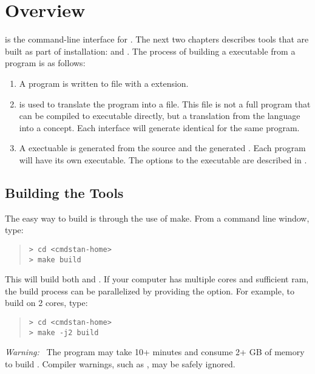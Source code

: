 \chapter{Overview}

\noindent
\CmdStan is the command-line interface for \Stan. The next two
chapters describes tools that are built as part of \CmdStan
installation:  and . The process of building a
\CmdStan executable from a \Stan program is as follows:
%
\begin{enumerate}
  \item A \Stan program is written to file with a 
    extension.
  \item {} is used to translate the \Stan program into a
    \Cpp file. This \Cpp file is not a full program that can be
    compiled to executable directly, but a translation from the \Stan
    language into a \Cpp concept. Each interface will generate identical
    \Cpp for the same \Stan program.
  \item A \CmdStan exectuable is generated from the \CmdStan source
    and the generated \Cpp. Each \Stan program will have its own
    \CmdStan executable. The options to the \CmdStan executable are
    described in .
\end{enumerate}


\section{Building the \CmdStan Tools}\label{build.section}

The easy way to build \CmdStan is through the use of make. From a
command line window, type:
%
\begin{quote}
\begin{Verbatim}[fontshape=sl,fontsize=\small]
> cd <cmdstan-home>
> make build
\end{Verbatim}
\end{quote}
%
This will build both  and . If your computer
has multiple cores and sufficient ram, the build process can be parallelized
by providing the  option. For example, to build on 2 cores, type:
%
\begin{quote}
\begin{Verbatim}[fontshape=sl,fontsize=\small]
> cd <cmdstan-home>
> make -j2 build
\end{Verbatim}
\end{quote}
%
\emph{Warning:} \ The  program may take 10+ minutes and
consume 2+ GB of memory to build \CmdStan.  Compiler warnings,
such as , may be safely ignored.

